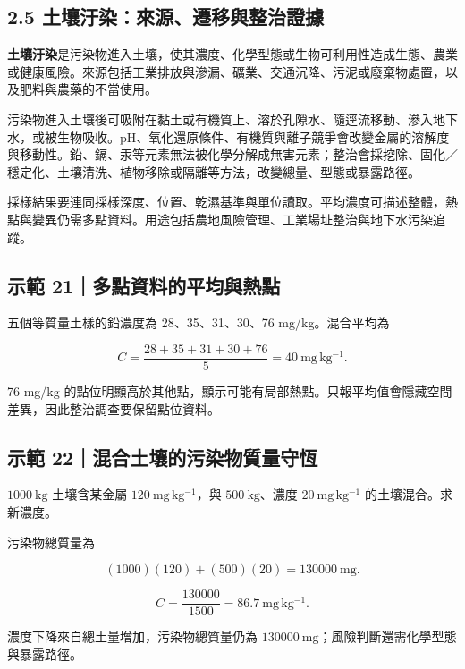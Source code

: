 \documentclass[11pt,a4paper]{article}
\begin{document}
\subsection{2.5 土壤汙染：來源、遷移與整治證據}\label{ux571fux58e4ux6c59ux67d3ux4f86ux6e90ux9077ux79fbux8207ux6574ux6cbbux8b49ux64da}

\textbf{土壤汙染}是污染物進入土壤，使其濃度、化學型態或生物可利用性造成生態、農業或健康風險。來源包括工業排放與滲漏、礦業、交通沉降、污泥或廢棄物處置，以及肥料與農藥的不當使用。

污染物進入土壤後可吸附在黏土或有機質上、溶於孔隙水、隨逕流移動、滲入地下水，或被生物吸收。pH、氧化還原條件、有機質與離子競爭會改變金屬的溶解度與移動性。鉛、鎘、汞等元素無法被化學分解成無害元素；整治會採挖除、固化／穩定化、土壤清洗、植物移除或隔離等方法，改變總量、型態或暴露路徑。

採樣結果要連同採樣深度、位置、乾濕基準與單位讀取。平均濃度可描述整體，熱點與變異仍需多點資料。用途包括農地風險管理、工業場址整治與地下水污染追蹤。

\begin{HandoutWorkedExample}

\subsection{示範 21｜多點資料的平均與熱點}\label{ux793aux7bc4-21ux591aux9edeux8cc7ux6599ux7684ux5e73ux5747ux8207ux71b1ux9ede}

五個等質量土樣的鉛濃度為 28、35、31、30、76 mg/kg。混合平均為

\[
\bar C=\frac{28+35+31+30+76}{5}=40\ \mathrm{mg\,kg^{-1}}.
\]

76 mg/kg 的點位明顯高於其他點，顯示可能有局部熱點。只報平均值會隱藏空間差異，因此整治調查要保留點位資料。

\end{HandoutWorkedExample}

\begin{HandoutWorkedExample}

\subsection{示範 22｜混合土壤的污染物質量守恆}\label{ux793aux7bc4-22ux6df7ux5408ux571fux58e4ux7684ux6c61ux67d3ux7269ux8ceaux91cfux5b88ux6046}

\(1000\ \mathrm{kg}\) 土壤含某金屬 \(120\ \mathrm{mg\,kg^{-1}}\)，與 \(500\ \mathrm{kg}\)、濃度 \(20\ \mathrm{mg\,kg^{-1}}\) 的土壤混合。求新濃度。

污染物總質量為

\[
(1000)(120)+(500)(20)=130000\ \mathrm{mg}.
\]

\[
C=\frac{130000}{1500}=86.7\ \mathrm{mg\,kg^{-1}}.
\]

濃度下降來自總土量增加，污染物總質量仍為 \(130000\ \mathrm{mg}\)；風險判斷還需化學型態與暴露路徑。

\end{HandoutWorkedExample}
\end{document}
